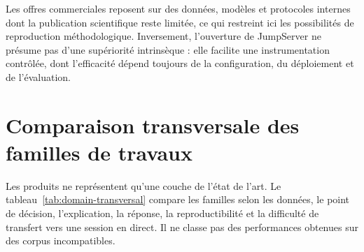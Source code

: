 \documentclass[11pt,a4paper,oneside]{report}
\theoremstyle{definition}
\theoremstyle{plain}
\begin{document}
Les offres commerciales reposent sur des données, modèles et protocoles internes dont la publication scientifique reste limitée, ce qui restreint ici les possibilités de reproduction méthodologique. Inversement, l'ouverture de JumpServer ne présume pas d'une supériorité intrinsèque : elle facilite une instrumentation contrôlée, dont l'efficacité dépend toujours de la configuration, du déploiement et de l'évaluation.

\section{Comparaison transversale des familles de travaux}
\label{sec:domain-transversal}

Les produits ne représentent qu'une couche de l'état de l'art. Le tableau~\ref{tab:domain-transversal} compare les familles selon les données, le point de décision, l'explication, la réponse, la reproductibilité et la difficulté de transfert vers une session en direct. Il ne classe pas des performances obtenues sur des corpus incompatibles.
\end{document}
